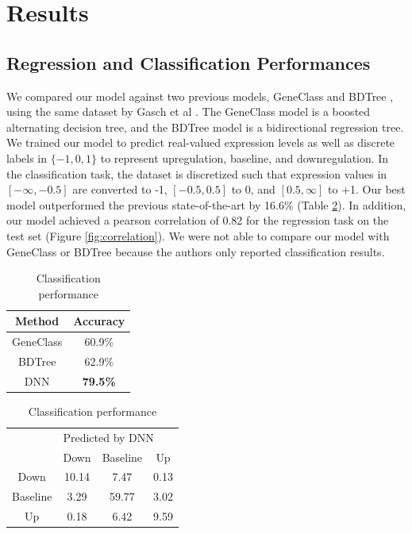 \documentclass{article}
\begin{document}
\section{Results}

\subsection{Regression and Classification Performances}
We compared our model against two previous models, GeneClass \cite{Middendorf:2004gta} and BDTree \cite{Ruan:2006hl}, using the same dataset by Gasch et al \cite{Gasch:2000wl}. The GeneClass model is a boosted alternating decision tree, and the BDTree model is a bidirectional regression tree. We trained our model to predict real-valued expression levels as well as discrete labels in $\{-1,0,1\}$ to represent upregulation, baseline, and downregulation. In the classification task, the dataset is discretized such that expression values in $[-\infty,-0.5]$ are converted to -1, $[-0.5,0.5]$ to 0, and $[0.5,\infty]$ to +1. Our best model outperformed the previous state-of-the-art by 16.6\% (Table \ref{table:classification performance}). In addition, our model achieved a pearson correlation of 0.82 for the regression task on the test set (Figure \ref{fig:correlation}). We were not able to compare our model with GeneClass or BDTree because the authors only reported classification results.

\begin{table}[!hbt]
\caption{Classification performance}
\centering
 \begin{tabular}{|c | c|} 
 \hline
 Method & Accuracy \\
 \hline
 GeneClass & 60.9\% \\ 
 \hline
 BDTree & 62.9\% \\
 \hline
 DNN & \textbf{79.5\%} \\
 \hline
\end{tabular}
\quad
\centering
 \begin{tabular}{|c | c c c|} 
 \hline
 {} & \multicolumn{3}{|l|}{Predicted by DNN} \\
  & Down & Baseline & Up \\ 
 \hline
 Down & 10.14 & 7.47 & 0.13 \\
 \hline
 Baseline & 3.29 & 59.77 & 3.02 \\
 \hline
 Up & 0.18 & 6.42 & 9.59 \\
 \hline
\end{tabular}
\label{table:classification performance}
\end{table}
\end{document}

